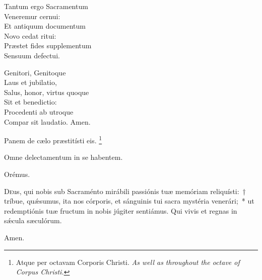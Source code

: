 Tantum ergo Sacramentum\\
Veneremur cernui:\\
Et antiquum documentum\\
Novo cedat ritui:\\
Præstet fides supplementum\\
Sensuum defectui.

Genitori, Genitoque\\
Laus et jubilatio,\\
Salus, honor, virtus quoque\\
Sit et benedictio:\\
Procedenti ab utroque\\
Compar sit laudatio. Amen.

\vv Panem de cælo præstitísti eis. \tpalleluia{}\footnote{Atque per octavam Corporis Christi. \textit{As well as throughout the octave of Corpus Christi.}}

\rr Omne delectamentum in se habentem. \tpalleluia{}

Orémus.

\lettrine{D}{e}us, qui nobis sub Sacraménto mirábili passiónis tuæ memóriam reliquísti:~† tríbue, quǽsumus, ita nos córporis, et sánguinis tui sacra mystéria venerári;~* ut redem\-ptiónis tuæ fru\-ctum in nobis júgiter sentiámus. Qui vivis et regnas in sǽcula sæculórum.

\rr Amen. 